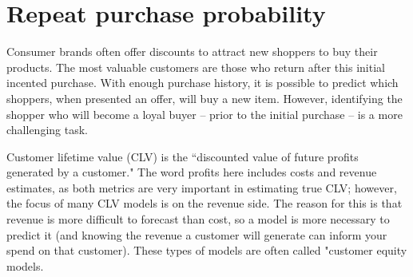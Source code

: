 \documentclass[11pt,fleqn]{book} %
\begin{document}


\chapter{Repeat purchase probability }

Consumer brands often offer discounts to attract new shoppers to buy their products. The most valuable customers are those who return after this initial incented purchase.  With enough purchase history, it is possible to predict which shoppers, when presented an offer, will buy a new item. However, identifying the shopper who will become a loyal buyer -- prior to the initial purchase -- is a more challenging task.

Customer lifetime value (CLV) is the “discounted value of future profits generated by a customer." The word profits here includes costs and revenue estimates, as both metrics are very important in estimating true CLV; however, the focus of many CLV models is on the revenue side. The reason for this is that revenue is more difficult to forecast than cost, so a model is more necessary to predict it (and knowing the revenue a customer will generate can inform your spend on that customer). These types of models are often called "customer equity models.


\end{document}
